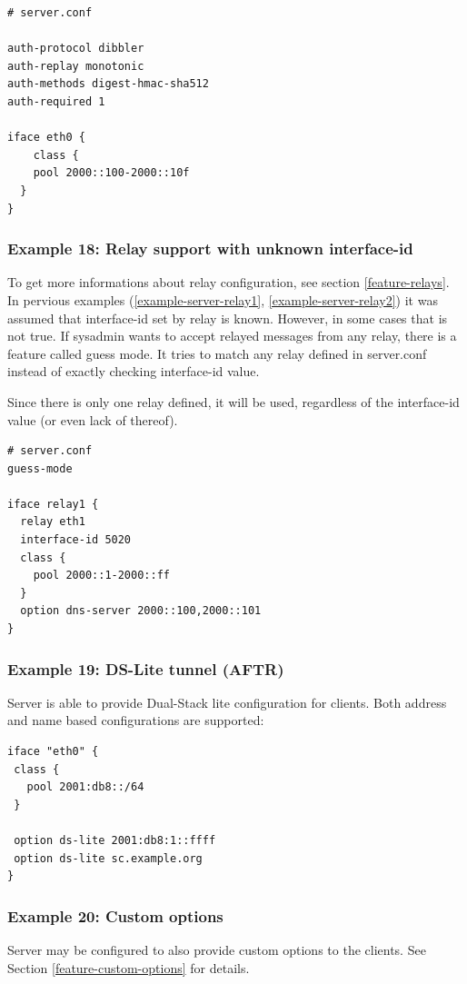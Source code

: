 \begin{lstlisting}
# server.conf

auth-protocol dibbler
auth-replay monotonic
auth-methods digest-hmac-sha512
auth-required 1

iface eth0 {
    class {
    pool 2000::100-2000::10f
  }
}
\end{lstlisting}

\subsubsection{Example 18: Relay support with unknown interface-id}
\label{example-server-relay3}
To get more informations about relay configuration, see section \ref{feature-relays}.
In pervious examples (\ref{example-server-relay1},
\ref{example-server-relay2}) it was assumed that interface-id set by
relay is known. However, in some cases that is not true. If sysadmin
wants to accept relayed messages from any relay, there is a feature
called guess mode. It tries to match any relay defined in server.conf
instead of exactly checking interface-id value.

Since there is only one relay defined, it will be used, regardless of
the interface-id value (or even lack of thereof).

\begin{lstlisting}
# server.conf
guess-mode

iface relay1 {
  relay eth1
  interface-id 5020
  class {
    pool 2000::1-2000::ff
  }
  option dns-server 2000::100,2000::101
}
\end{lstlisting}


\subsubsection{Example 19: DS-Lite tunnel (AFTR)}
Server is able to provide Dual-Stack lite configuration for clients.
Both address and name based configurations are supported:

\begin{lstlisting}
iface "eth0" {
 class {
   pool 2001:db8::/64
 }

 option ds-lite 2001:db8:1::ffff
 option ds-lite sc.example.org
}
\end{lstlisting}

\subsubsection{Example 20: Custom options}
\label{example-server-custom}
Server may be configured to also provide custom options to the
clients. See Section \ref{feature-custom-options} for details.

